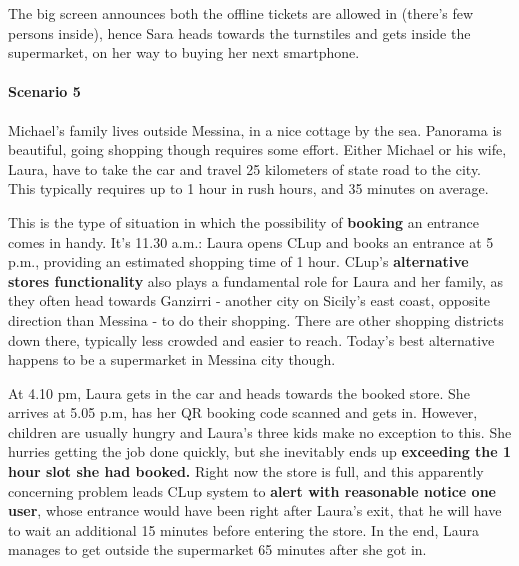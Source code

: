 The big screen announces both the offline tickets are allowed in (there's few persons inside), hence Sara heads towards the turnstiles and gets inside the supermarket, on her way to buying her next smartphone.


\paragraph{Scenario 5}

Michael's family lives outside Messina, in a nice cottage by the sea. Panorama is beautiful, going shopping though requires some effort. \newline
Either Michael or his wife, Laura, have to take the car and travel 25 kilometers of state road to the city. This typically requires up to 1 hour in rush hours, and 35 minutes on average.

This is the type of situation in which the possibility of \textbf{booking} an entrance comes in handy. It's 11.30 a.m.: Laura opens CLup and books an entrance at 5 p.m., providing an estimated shopping time of 1 hour. \newline
CLup's \textbf{alternative stores functionality} also plays a fundamental role for Laura and her family, as they often head towards Ganzirri - another city on Sicily's east coast, opposite direction than Messina - to do their shopping. There are other shopping districts down there, typically less crowded and easier to reach. Today's best alternative happens to be a supermarket in Messina city though.

At 4.10 pm, Laura gets in the car and heads towards the booked store. She arrives at 5.05 p.m, has her QR booking code scanned and gets in. \newline
However, children are usually hungry and Laura's three kids make no exception to this. She hurries getting the job done quickly, but she inevitably ends up \textbf{exceeding the 1 hour slot she had booked.} \newline
Right now the store is full, and this apparently concerning problem leads CLup system to \textbf{alert with reasonable notice one user}, whose entrance would have been right after Laura's exit, that he will have to wait an additional 15 minutes before entering the store. \newline
In the end, Laura manages to get outside the supermarket 65 minutes after she got in. 


